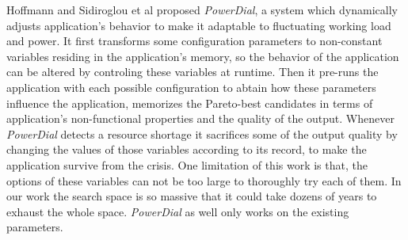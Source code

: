 Hoffmann and Sidiroglou et al\cite{Hoffmann:2011:DKR:1961296.1950390} proposed \emph{PowerDial}, a system which dynamically adjusts application's behavior to make it adaptable to fluctuating working load and power. It first transforms some configuration parameters to non-constant variables residing in the application's memory, so the behavior of the application can be altered by controling these variables at runtime. Then it pre-runs the application with each possible configuration to abtain how these parameters influence the application, memorizes the Pareto-best candidates in terms of application's non-functional properties and the quality of the output. Whenever \emph{PowerDial} detects a resource shortage it sacrifices some of the output quality by changing the values of those variables according to its record, to make the application survive from the crisis. One limitation of this work is that, the options of these variables can not be too large to thoroughly try each of them. In our work the search space is so massive that it could take dozens of years to exhaust the whole space. \emph{PowerDial} as well only works on the existing parameters.
